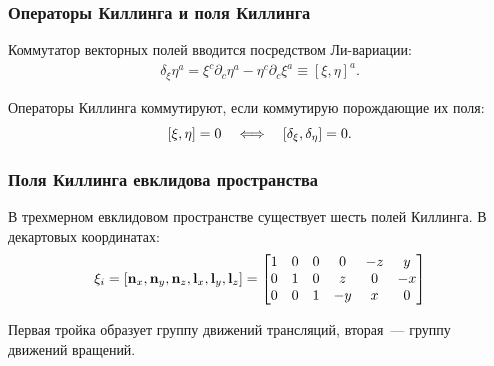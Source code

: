 \documentclass{beamer}
\begin{document}
    \begin{frame}\frametitle{Операторы Киллинга и поля Киллинга}

        Коммутатор векторных полей вводится посредством Ли-вариации:
        \begin{equation}\begin{aligned}\label{eq:vector_field_commutator}
            \delta_\xi \eta^a
                = \xi^c \partial_c \eta^a - \eta^c \partial_{c} \xi^a
                \equiv [\xi, \eta]^a.
        \end{aligned}\end{equation}

        \begin{theorem}[О коммутации]
            Операторы Киллинга коммутируют, если коммутирую порождающие их поля:
            \begin{equation}
                \qty[\xi, \eta] = 0
                \quad \Longleftrightarrow \quad
                \qty[\delta_\xi, \delta_\eta] = 0 .
            \end{equation}
        \end{theorem}

    \end{frame}


    \begin{frame}\frametitle{Поля Киллинга евклидова пространства}

        В трехмерном евклидовом пространстве существует шесть полей Киллинга. В декартовых координатах:
        \begin{equation}
            \mathbf{\xi}_i
            =
            \left[
                \mathbf{n}_x, \mathbf{n}_y, \mathbf{n}_z,
                \mathbf{l}_x, \mathbf{l}_y, \mathbf{l}_z
            \right]
            =
            \begin{bmatrix}
                1 & 0 & 0 & 0  & -z & y  \\
                0 & 1 & 0 & z  & 0  & -x \\
                0 & 0 & 1 & -y & x  & 0
            \end{bmatrix}
        \end{equation}

        Первая тройка образует группу движений трансляций, вторая~--- группу движений вращений.

    \end{frame}
\end{document}
